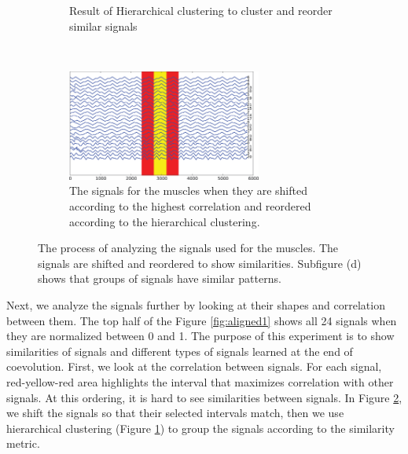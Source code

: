 \documentclass[twocolumn,10pt]{asme2ej}
\begin{document}
\begin{figure}
\begin{subfigure}[b]{\columnwidth}
                \caption{Result of Hierarchical clustering to cluster and reorder similar signals}
				\label{fig:clustering}
        \end{subfigure}\\
        \begin{subfigure}[b]{\columnwidth}
        		\centering
                \includegraphics[width=0.7\textwidth]{results/signals/aligned2.eps}
                \caption{The signals for the muscles when they are shifted according to the highest correlation and reordered according to the hierarchical clustering. }
				\label{fig:aligned2}
        \end{subfigure}
        \caption{The process of analyzing the signals used for the muscles. The signals are shifted and reordered to show similarities. Subfigure (d) shows that groups of signals have similar patterns.}
        \label{fig:correlationAll}
\end{figure}

Next, we analyze the signals further by looking at their shapes and correlation between them. The top half of the Figure \ref{fig:aligned1} shows all 24 signals when they are normalized between 0 and 1. The purpose of this experiment is to show similarities of signals and different types of signals learned at the end of coevolution. First, we look at the correlation between signals. For each signal, red-yellow-red area highlights the interval that maximizes correlation with other signals. At this ordering, it is hard to see similarities between signals. In Figure \ref{fig:aligned2}, we shift the signals so that their selected intervals match, then we use hierarchical clustering (Figure \ref{fig:clustering}) to group the signals according to the similarity metric. 
\end{document}

